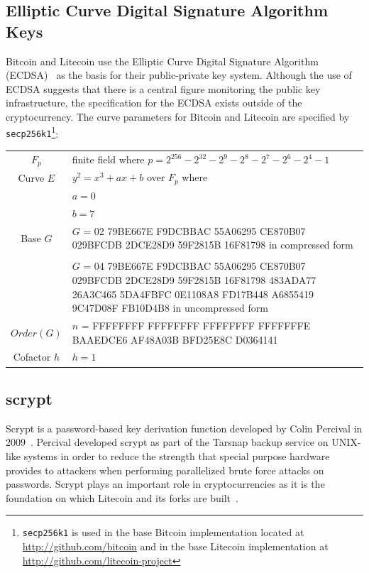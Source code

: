 \documentclass[11pt]{article}
\begin{document}
\subsection{Elliptic Curve Digital Signature Algorithm Keys}
Bitcoin and Litecoin use the Elliptic Curve Digital Signature Algorithm (ECDSA)~\cite{johnson01}
as the basis for their public-private key system. Although the use of ECDSA
suggests that there is a central figure monitoring the public key
infrastructure, the specification for the ECDSA exists outside of the
cryptocurrency. The curve parameters for Bitcoin and Litecoin are specified by
{\tt secp256k1}\footnote{{\tt secp256k1} is used in the base
Bitcoin implementation located at \url{http://github.com/bitcoin} and in the base
Litecoin implementation at \url{http://github.com/litecoin-project}}\cite{secg}:
\vspace{1em}\\
\begin{tabularx}{\textwidth}{cX}
    $F_p$ & finite field where
        $p = 2^{256} - 2^{32} - 2^9 - 2^8 - 2^7 - 2^6 - 2^4 - 1$\\
    Curve $E$ & $y^2 = x^3 + ax + b$ over $F_p$ where\\
    & $a = 0$\\
    & $b = 7$\\
    Base $G$ & $G$ = 02 79BE667E F9DCBBAC 55A06295 CE870B07 029BFCDB 2DCE28D9
        59F2815B 16F81798 in compressed form\\
    & \\
             & $G$ = 04 79BE667E F9DCBBAC 55A06295 CE870B07 029BFCDB 2DCE28D9 59F2815B 16F81798 483ADA77 26A3C465 5DA4FBFC 0E1108A8 FD17B448 A6855419 9C47D08F FB10D4B8 in uncompressed form\\
    $Order(G)$ & $n$ = FFFFFFFF FFFFFFFF FFFFFFFF FFFFFFFE BAAEDCE6 AF48A03B
        BFD25E8C D0364141\\
    Cofactor $h$ & $h = 1$
\end{tabularx}

\subsection{scrypt}
Scrypt is a password-based key derivation function developed by Colin Percival
in 2009~\cite{percival09}. Percival developed scrypt as part of the Tarsnap
backup service on UNIX-like systems in order to reduce the strength that
special purpose hardware provides to attackers when performing parallelized
brute force attacks on passwords. Scrypt plays an important role in
cryptocurrencies as it is the foundation on which Litecoin and its forks are
built~\cite{sprankel13}.
\end{document}
